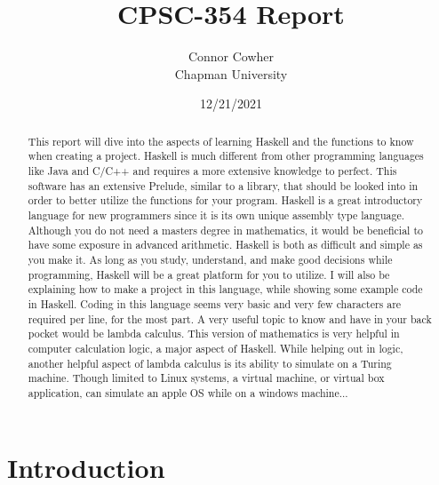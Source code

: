 \documentclass{article}
\title{CPSC-354 Report}
\author{Connor Cowher \\ Chapman University}
\date{12/21/2021}
\begin{document}
\maketitle

\begin{abstract}
This report will dive into the aspects of learning Haskell and the functions to know when creating a project. Haskell is much different from other programming languages like Java and C/C++ and requires a more extensive knowledge to perfect. This software has an extensive Prelude, similar to a library, that should be looked into in order to better utilize the functions for your program. Haskell is a great introductory language for new programmers since it is its own unique assembly type language. Although you do not need a masters degree in mathematics, it would be beneficial to have some exposure in advanced arithmetic. Haskell is both as difficult and simple as you make it. As long as you study, understand, and make good decisions while programming, Haskell will be a great platform for you to utilize. I will also be explaining how to make a project in this language, while showing some example code in Haskell. Coding in this language seems very basic and very few characters are required per line, for the most part. A very useful topic to know and have in your back pocket would be lambda calculus. This version of mathematics is very helpful in computer calculation logic, a major aspect of Haskell. While helping out in logic, another helpful aspect of lambda calculus is its ability to simulate on a Turing machine. Though limited to Linux systems, a virtual machine, or virtual box application, can simulate an apple OS while on a windows machine...
\clearpage
\end{abstract}

\tableofcontents
\clearpage

\section{Introduction}\label{intro} 
\end{document}
